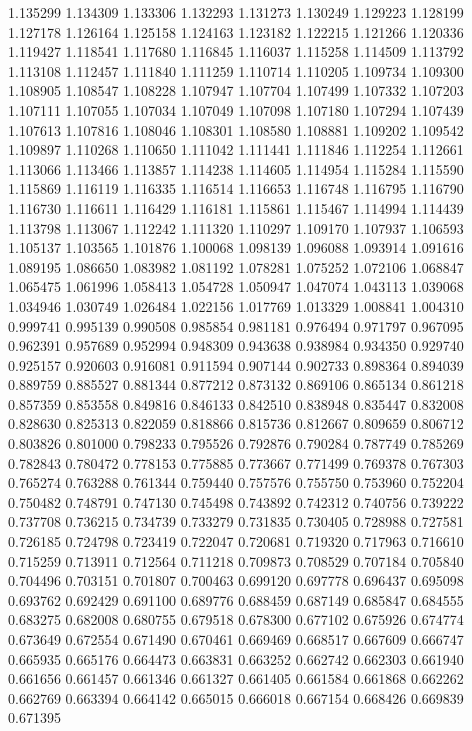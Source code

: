 1.135299
1.134309
1.133306
1.132293
1.131273
1.130249
1.129223
1.128199
1.127178
1.126164
1.125158
1.124163
1.123182
1.122215
1.121266
1.120336
1.119427
1.118541
1.117680
1.116845
1.116037
1.115258
1.114509
1.113792
1.113108
1.112457
1.111840
1.111259
1.110714
1.110205
1.109734
1.109300
1.108905
1.108547
1.108228
1.107947
1.107704
1.107499
1.107332
1.107203
1.107111
1.107055
1.107034
1.107049
1.107098
1.107180
1.107294
1.107439
1.107613
1.107816
1.108046
1.108301
1.108580
1.108881
1.109202
1.109542
1.109897
1.110268
1.110650
1.111042
1.111441
1.111846
1.112254
1.112661
1.113066
1.113466
1.113857
1.114238
1.114605
1.114954
1.115284
1.115590
1.115869
1.116119
1.116335
1.116514
1.116653
1.116748
1.116795
1.116790
1.116730
1.116611
1.116429
1.116181
1.115861
1.115467
1.114994
1.114439
1.113798
1.113067
1.112242
1.111320
1.110297
1.109170
1.107937
1.106593
1.105137
1.103565
1.101876
1.100068
1.098139
1.096088
1.093914
1.091616
1.089195
1.086650
1.083982
1.081192
1.078281
1.075252
1.072106
1.068847
1.065475
1.061996
1.058413
1.054728
1.050947
1.047074
1.043113
1.039068
1.034946
1.030749
1.026484
1.022156
1.017769
1.013329
1.008841
1.004310
0.999741
0.995139
0.990508
0.985854
0.981181
0.976494
0.971797
0.967095
0.962391
0.957689
0.952994
0.948309
0.943638
0.938984
0.934350
0.929740
0.925157
0.920603
0.916081
0.911594
0.907144
0.902733
0.898364
0.894039
0.889759
0.885527
0.881344
0.877212
0.873132
0.869106
0.865134
0.861218
0.857359
0.853558
0.849816
0.846133
0.842510
0.838948
0.835447
0.832008
0.828630
0.825313
0.822059
0.818866
0.815736
0.812667
0.809659
0.806712
0.803826
0.801000
0.798233
0.795526
0.792876
0.790284
0.787749
0.785269
0.782843
0.780472
0.778153
0.775885
0.773667
0.771499
0.769378
0.767303
0.765274
0.763288
0.761344
0.759440
0.757576
0.755750
0.753960
0.752204
0.750482
0.748791
0.747130
0.745498
0.743892
0.742312
0.740756
0.739222
0.737708
0.736215
0.734739
0.733279
0.731835
0.730405
0.728988
0.727581
0.726185
0.724798
0.723419
0.722047
0.720681
0.719320
0.717963
0.716610
0.715259
0.713911
0.712564
0.711218
0.709873
0.708529
0.707184
0.705840
0.704496
0.703151
0.701807
0.700463
0.699120
0.697778
0.696437
0.695098
0.693762
0.692429
0.691100
0.689776
0.688459
0.687149
0.685847
0.684555
0.683275
0.682008
0.680755
0.679518
0.678300
0.677102
0.675926
0.674774
0.673649
0.672554
0.671490
0.670461
0.669469
0.668517
0.667609
0.666747
0.665935
0.665176
0.664473
0.663831
0.663252
0.662742
0.662303
0.661940
0.661656
0.661457
0.661346
0.661327
0.661405
0.661584
0.661868
0.662262
0.662769
0.663394
0.664142
0.665015
0.666018
0.667154
0.668426
0.669839
0.671395
